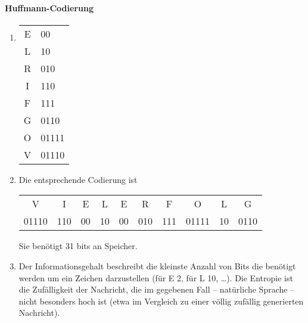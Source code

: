 \documentclass{article}
\begin{document}
\paragraph{Huffmann-Codierung}

\begin{enumerate}
    \item
    
    \begin{minipage}{.49\textwidth}
        \centering
    \end{minipage}
    \begin{minipage}{.49\textwidth}
        \centering
        \begin{tabular}{cl}
            E & 00 \\
            L & 10 \\
            R & 010\\
            I & 110\\
            F & 111\\
            G & 0110\\
            O & 01111\\
            V & 01110
        \end{tabular}
    \end{minipage}

    \item Die entsprechende Codierung ist
    \begin{center}
        \begin{tabular}{cccccccccc}
            V&I&E&L&E&R&F&O&L&G \\
            01110&110&00&10&00&010&111&01111&10&0110 \\
        \end{tabular}
    \end{center}
    Sie benötigt 31 bits an Speicher.

    \item Der Informationsgehalt beschreibt die kleinste Anzahl von Bits die benötigt werden um ein Zeichen darzustellen (für E 2, für L 10, \ldots). Die Entropie ist die Zufälligkeit der Nachricht, die im gegebenen Fall -- natürliche Sprache -- nicht besonders hoch ist (etwa im Vergleich zu einer völlig zufällig generierten Nachricht).
\end{enumerate}
\end{document}
